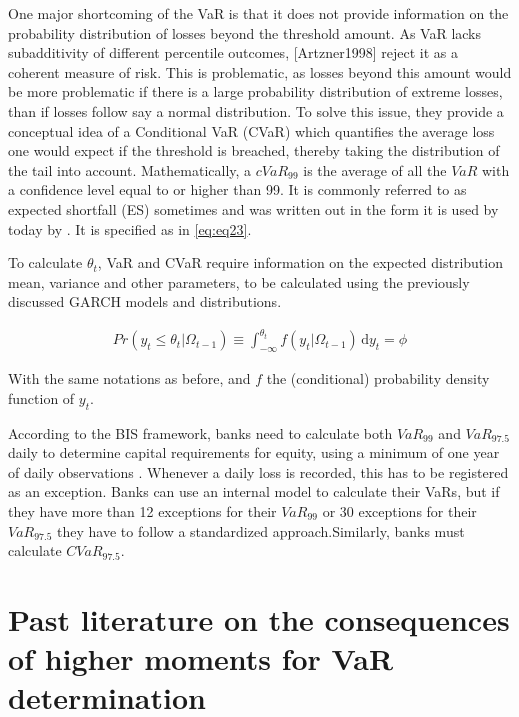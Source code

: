 \documentclass[a4paper, nobind]{templates/ociamthesis}
\begin{document}
One major shortcoming of the VaR is that it does not provide information on the probability distribution of losses beyond the threshold amount. As VaR lacks subadditivity of different percentile outcomes, {[}Artzner1998{]} reject it as a coherent measure of risk. This is problematic, as losses beyond this amount would be more problematic if there is a large probability distribution of extreme losses, than if losses follow say a normal distribution. To solve this issue, they provide a conceptual idea of a Conditional VaR (CVaR) which quantifies the average loss one would expect if the threshold is breached, thereby taking the distribution of the tail into account. Mathematically, a \(cVaR_{99}\) is the average of all the \(VaR\) with a confidence level equal to or higher than 99. It is commonly referred to as expected shortfall (ES) sometimes and was written out in the form it is used by today by \autocite{bertsimas2004}. It is specified as in \eqref{eq:eq23}.

To calculate \(\theta_t\), VaR and CVaR require information on the expected distribution mean, variance and other parameters, to be calculated using the previously discussed GARCH models and distributions.

\begin{align}
Pr(y_t \le \theta_t | \Omega_{t-1}) \equiv \int_{-\infty}^{\theta_t} \! f(y_t | \Omega_{t-1}) \, \mathrm{d}y_t = \phi
 \label{eq:eq23}
\end{align}

With the same notations as before, and \(f\) the (conditional) probability density function of \(y_t\).

According to the BIS framework, banks need to calculate both \(VaR_{99}\) and \(VaR_{97.5}\) daily to determine capital requirements for equity, using a minimum of one year of daily observations \autocite{baselcommitteeonbankingsupervision2016}. Whenever a daily loss is recorded, this has to be registered as an exception. Banks can use an internal model to calculate their VaRs, but if they have more than 12 exceptions for their \(VaR_{99}\) or 30 exceptions for their \(VaR_{97.5}\) they have to follow a standardized approach.Similarly, banks must calculate \(CVaR_{97.5}\).

\hypertarget{past-lit}{%
\section{Past literature on the consequences of higher moments for VaR determination}\label{past-lit}}
\end{document}

